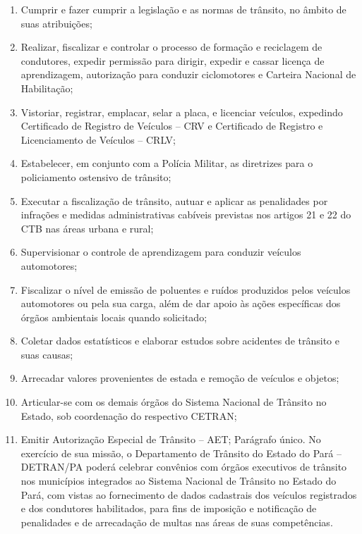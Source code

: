 \documentclass[a4paper]{article}
\begin{document}
\begin{enumerate}

\item Cumprir e fazer cumprir a legislação e as normas de trânsito, no âmbito de suas atribuições;
\item Realizar, fiscalizar e controlar o processo de formação e reciclagem de condutores, expedir permissão para dirigir, expedir e cassar licença de aprendizagem, autorização para conduzir ciclomotores e Carteira Nacional de Habilitação;
\item Vistoriar, registrar, emplacar, selar a placa, e licenciar veículos, expedindo Certificado de Registro de Veículos – CRV e Certificado de Registro e Licenciamento de Veículos – CRLV;
\item Estabelecer, em conjunto com a Polícia Militar, as diretrizes para o policiamento ostensivo de trânsito;
\item Executar a fiscalização de trânsito, autuar e aplicar as penalidades por infrações e medidas administrativas cabíveis previstas nos artigos 21 e 22 do CTB nas áreas urbana e rural;
\item Supervisionar o controle de aprendizagem para conduzir veículos automotores;
\item Fiscalizar o nível de emissão de poluentes e ruídos produzidos pelos veículos automotores ou pela sua carga, além de dar apoio às ações específicas dos órgãos ambientais locais quando solicitado;
\item Coletar dados estatísticos e elaborar estudos sobre acidentes de trânsito e suas causas;
\item Arrecadar valores provenientes de estada e remoção de veículos e objetos;
\item Articular-se com os demais órgãos do Sistema Nacional de Trânsito no Estado, sob coordenação do respectivo CETRAN;
\item Emitir Autorização Especial de Trânsito – AET;
Parágrafo único. No exercício de sua missão, o Departamento de Trânsito do Estado do Pará – DETRAN/PA poderá celebrar convênios com órgãos executivos de trânsito nos municípios integrados ao Sistema Nacional de Trânsito no Estado do Pará, com vistas ao fornecimento de dados cadastrais dos veículos registrados e dos condutores habilitados, para fins de imposição e notificação de penalidades e de arrecadação de multas nas áreas de suas competências.
\end{enumerate}
\end{document}
